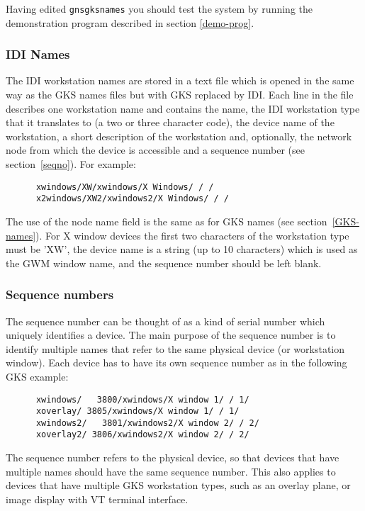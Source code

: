 \documentclass[twoside,11pt]{article}
\newcommand{\hyperref}[4]{#2\ref{#4}#3}
\renewcommand{\_}{\texttt{\symbol{95}}}
\begin{document}
Having edited {\tt gns\_gksnames} you should test the system by
running the
demonstration program described in section \ref{demo-prog}.

\subsubsection{IDI Names}

The IDI workstation names are stored in a text file which is opened in the
same way as the GKS names files but with GKS replaced by IDI.
Each line in the file describes one workstation name
and contains the name, the IDI workstation type that it translates to (a two
or three character code), the
device name of the workstation, a short description of the workstation and,
optionally, the network node from which the device is accessible and a
sequence number (see \hyperref{this section}{section~}{}{seqno}). For example:
\begin{verbatim}
      xwindows/XW/xwindows/X Windows/ / /
      x2windows/XW2/xwindows2/X Windows/ / /
\end{verbatim}
The use of the node name field is the same as for GKS names
(see \hyperref{this section}{section~}{}{GKS-names}).
For X window devices the first two characters
of the workstation type must be 'XW', the device name is a string (up to
10 characters) which is used as the GWM window name, and the sequence
number should be left blank.

\subsubsection{\label{seqno}Sequence numbers}

The sequence number can be thought of as a kind of serial number which
uniquely identifies a device. The main purpose of the sequence number
is to identify multiple names that refer to the same
physical device (or workstation window).
Each device has to have its own sequence
number as in the following GKS example:
\begin{verbatim}
      xwindows/   3800/xwindows/X window 1/ / 1/
      xoverlay/ 3805/xwindows/X window 1/ / 1/
      xwindows2/   3801/xwindows2/X window 2/ / 2/
      xoverlay2/ 3806/xwindows2/X window 2/ / 2/
\end{verbatim}
The sequence number refers to the physical device, so that devices that
have multiple names should have the same sequence number. This also
applies to devices that have multiple GKS workstation types, such as an
overlay plane, or image display with VT terminal interface.
\end{document}
